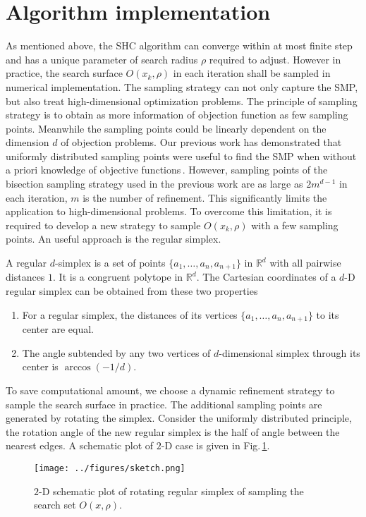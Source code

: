 \documentclass[preprint,12pt]{elsarticle}
\def\bbR{\mathbb{R}}
\begin{document}
\section{Algorithm implementation}


As mentioned above, the SHC algorithm can converge within at most 
finite step and has a unique parameter of search radius
$\rho$ required to adjust. However in practice, the search
surface $O(x_k,\rho)$ in each iteration shall be sampled in
numerical implementation. The sampling strategy can not
only capture the SMP, but also treat high-dimensional
optimization problems. The principle of sampling strategy
is to obtain as more information of objection function as few
sampling points. Meanwhile the sampling points could be linearly
dependent on the dimension $d$ of objection problems. 
Our previous work has demonstrated that uniformly distributed
sampling points were useful to find the SMP when
without a priori knowledge of objective functions\,\cite{huang2017hill}. 
However, sampling points of the bisection sampling strategy used in the
previous work are as large as $2m^{d-1}$ in each iteration, $m$
is the number of refinement. This significantly limits the
application to high-dimensional problems. 
To overcome this limitation, it is required to develop a new
strategy to sample $O(x_k,\rho)$ with a few sampling points.
An useful approach is the regular simplex. 

A regular $d$-simplex is a set of points
$\{a_1,\dots,a_n,a_{n+1}\}$ in $\bbR^d$ with all pairwise
distances $1$. It is a congruent polytope in $\bbR^d$. 
The Cartesian coordinates of a $d$-D regular simplex 
can be obtained from these two
properties\,\cite{simplexWiki}
\begin{enumerate}
	\item For a regular simplex, the distances of its vertices 
		$\{a_1,\dots,a_n,a_{n+1}\}$ to its center are equal.
	\item The angle subtended by any two vertices of $d$-dimensional simplex through its center is
		$\arccos(-1/d)$.
\end{enumerate}

To save computational amount, we choose a dynamic refinement
strategy to sample the search surface in practice.
The additional sampling points are generated by rotating the simplex. 
Consider the uniformly distributed principle, 
the rotation angle of the new regular simplex is the half of
angle between the nearest edges. A schematic plot of $2$-D case
is given in Fig.\,\ref{fig:obset:sketch}.
\begin{figure}[!htbp]
	\centering
	  \texttt{[image: ../figures/sketch.png]}
	\caption{$2$-D schematic plot of rotating regular simplex of
	sampling the search set $O(x, \rho)$.}
\label{fig:obset:sketch}
\end{figure}
\end{document}
